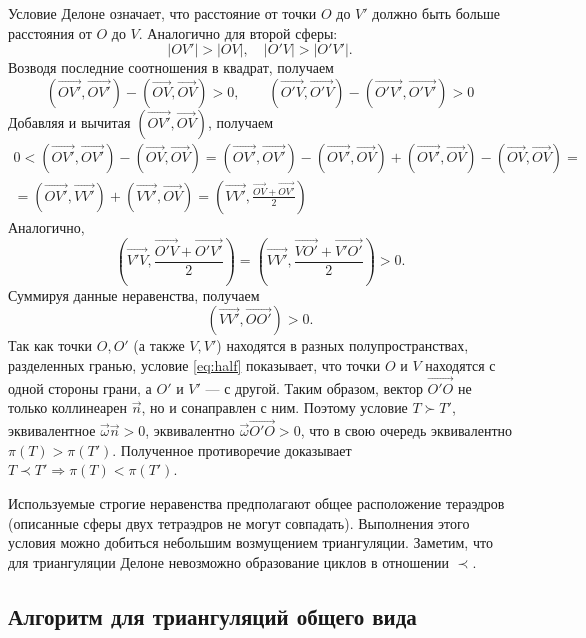 Условие Делоне означает, что расстояние от точки $O$ до $V'$ должно быть больше расстояния от $O$ до $V$. Аналогично для второй сферы:
\[
|OV'| > |OV|, \quad |O'V| > |O'V'|.
\]
Возводя последние соотношения в квадрат, получаем
\[
(\overrightarrow{OV'},\overrightarrow{OV'}) - (\overrightarrow{OV},\overrightarrow{OV}) > 0, \qquad
(\overrightarrow{O'V},\overrightarrow{O'V}) - (\overrightarrow{O'V'},\overrightarrow{O'V'}) > 0
\]
Добавляя и вычитая $(\overrightarrow{OV'},\overrightarrow{OV})$, получаем
\begin{multline*}
0 < (\overrightarrow{OV'},\overrightarrow{OV'}) - (\overrightarrow{OV},\overrightarrow{OV}) =
(\overrightarrow{OV'},\overrightarrow{OV'}) 
-(\overrightarrow{OV'},\overrightarrow{OV})
+(\overrightarrow{OV'},\overrightarrow{OV})
- (\overrightarrow{OV},\overrightarrow{OV}) = \\ =
(\overrightarrow{OV'},\overrightarrow{VV'}) 
+
(\overrightarrow{VV'}, \overrightarrow{OV}) = 
\left(\overrightarrow{VV'}, \frac{\overrightarrow{OV}+ \overrightarrow{OV'}}{2}\right)
\end{multline*}
Аналогично,
\[
\left(\overrightarrow{V'V}, \frac{\overrightarrow{O'V}+ \overrightarrow{O'V'}}{2}\right)  =
\left(\overrightarrow{VV'}, \frac{\overrightarrow{VO'}+ \overrightarrow{V'O'}}{2}\right) 
> 0.
\]
Суммируя данные неравенства, получаем
\begin{equation}
(\overrightarrow{VV'},\overrightarrow{OO'}) > 0.
\label{eq:half}
\end{equation}
Так как точки $O,O'$ (а также $V,V'$) находятся в разных полупространствах, разделенных гранью, условие \eqref{eq:half} показывает, что точки $O$ и $V$ находятся с одной стороны грани, а $O'$ и $V'$ --- с другой. Таким образом, вектор $\overrightarrow{O'O}$ не только коллинеарен $\vec n$, но и сонаправлен с ним. Поэтому условие $T \succ T'$, эквивалентное $\vec \omega \vec n > 0$, эквивалентно $\vec \omega \overrightarrow{O'O} > 0$, что в свою очередь эквивалентно $\pi(T) > \pi(T')$. Полученное противоречие доказывает $T \prec T' \Rightarrow \pi(T) < \pi(T')$.

Используемые строгие неравенства предполагают общее расположение тераэдров (описанные сферы двух тетраэдров не могут совпадать). Выполнения этого условия можно добиться небольшим возмущением триангуляции. Заметим, что для триангуляции Делоне невозможно образование циклов в отношении $\prec$.


\subsection{Алгоритм для триангуляций общего вида}

